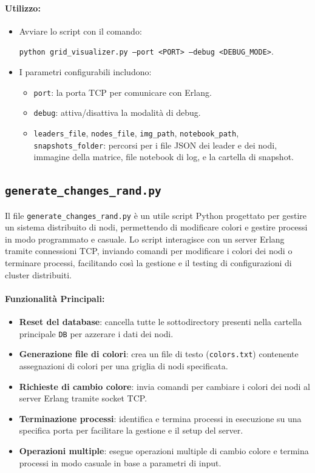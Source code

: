 \documentclass[12pt, a4paper]{report}
\begin{document}
\paragraph{Utilizzo:}
\begin{itemize}
    \item Avviare lo script con il comando:

      \hspace{20pt}\texttt{python grid\_visualizer.py --port <PORT> --debug <DEBUG\_MODE>}.
    \item I parametri configurabili includono: 
    \begin{itemize}
        \item \texttt{port}: la porta TCP per comunicare con Erlang.
        \item \texttt{debug}: attiva/disattiva la modalità di debug.
        \item \texttt{leaders\_file}, \texttt{nodes\_file}, \texttt{img\_path}, \texttt{notebook\_path}, \texttt{snapshots\_folder}: percorsi per i file JSON dei leader e dei nodi, immagine della matrice, file notebook di log, e la cartella di snapshot.
    \end{itemize}
\end{itemize}

\subsection{\texttt{generate\_changes\_rand.py}}\label{sec:random_changes}

Il file \texttt{generate\_changes\_rand.py} \`e un utile script Python progettato per gestire un sistema distribuito di nodi, permettendo di modificare colori e gestire processi in modo programmato e casuale. Lo script interagisce con un server Erlang tramite connessioni TCP, inviando comandi per modificare i colori dei nodi o terminare processi, facilitando così la gestione e il testing di configurazioni di cluster distribuiti.

\paragraph{Funzionalità Principali:}
\begin{itemize}
    \item \textbf{Reset del database}: cancella tutte le sottodirectory presenti nella cartella principale \texttt{DB} per azzerare i dati dei nodi.
    \item \textbf{Generazione file di colori}: crea un file di testo (\texttt{colors.txt}) contenente assegnazioni di colori per una griglia di nodi specificata.
    \item \textbf{Richieste di cambio colore}: invia comandi per cambiare i colori dei nodi al server Erlang tramite socket TCP.
    \item \textbf{Terminazione processi}: identifica e termina processi in esecuzione su una specifica porta per facilitare la gestione e il setup del server.
    \item \textbf{Operazioni multiple}: esegue operazioni multiple di cambio colore e termina processi in modo casuale in base a parametri di input.
\end{itemize}
\end{document}
